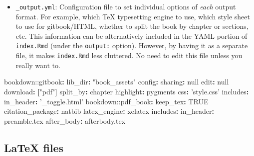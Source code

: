 \documentclass[
]{book}
\newenvironment{Shaded}{\begin{snugshade}}{\end{snugshade}}
\newcommand{\AttributeTok}[1]{\textcolor[rgb]{0.77,0.63,0.00}{#1}}
\newcommand{\CharTok}[1]{\textcolor[rgb]{0.31,0.60,0.02}{#1}}
\newcommand{\FunctionTok}[1]{\textcolor[rgb]{0.00,0.00,0.00}{#1}}
\newcommand{\KeywordTok}[1]{\textcolor[rgb]{0.13,0.29,0.53}{\textbf{#1}}}
\newcommand{\StringTok}[1]{\textcolor[rgb]{0.31,0.60,0.02}{#1}}
\providecommand{\tightlist}{%
  \setlength{\itemsep}{0pt}\setlength{\parskip}{0pt}}
\theoremstyle{definition}
\theoremstyle{definition}
\theoremstyle{definition}
\theoremstyle{remark}
\begin{document}
\begin{itemize}
\tightlist
\item
  \texttt{\_output.yml}: Configuration file to set individual options of \emph{each} output format. For example, which TeX typesetting engine to use, which style sheet to use for gitbook/HTML, whether to split the book by chapter or sections, etc. This information can be alternatively included in the YAML portion of \texttt{index.Rmd} (under the \texttt{output:} option). However, by having it as a separate file, it makes \texttt{index.Rmd} less cluttered. No need to edit this file unless you really want to.
\end{itemize}

\begin{Shaded}
\begin{Highlighting}[]
\AttributeTok{bookdown:}\FunctionTok{:gitbook}\KeywordTok{:}
\AttributeTok{  }\FunctionTok{lib_dir}\KeywordTok{:}\AttributeTok{ }\StringTok{"book_assets"}
\AttributeTok{  }\FunctionTok{config}\KeywordTok{:}
\AttributeTok{    }\FunctionTok{sharing}\KeywordTok{:}\AttributeTok{ }\CharTok{null}
\AttributeTok{    }\FunctionTok{edit}\KeywordTok{:}\AttributeTok{ }\CharTok{null}
\AttributeTok{    }\FunctionTok{download}\KeywordTok{:}\AttributeTok{ }\KeywordTok{[}\StringTok{"pdf"}\KeywordTok{]}
\AttributeTok{  }\FunctionTok{split_by}\KeywordTok{:}\AttributeTok{ chapter}
\AttributeTok{  }\FunctionTok{highlight}\KeywordTok{:}\AttributeTok{ pygments}
\AttributeTok{  }\FunctionTok{css}\KeywordTok{:}\AttributeTok{ }\StringTok{'style.css'}
\AttributeTok{  }\FunctionTok{includes}\KeywordTok{:}
\AttributeTok{    }\FunctionTok{in_header}\KeywordTok{:}\AttributeTok{ }\StringTok{'_toggle.html'}
\AttributeTok{    }
\AttributeTok{bookdown:}\FunctionTok{:pdf_book}\KeywordTok{:}
\AttributeTok{  }\FunctionTok{keep_tex}\KeywordTok{:}\AttributeTok{ }\CharTok{TRUE}
\AttributeTok{  }\FunctionTok{citation_package}\KeywordTok{:}\AttributeTok{ natbib}
\AttributeTok{  }\FunctionTok{latex_engine}\KeywordTok{:}\AttributeTok{ xelatex}
\AttributeTok{  }\FunctionTok{includes}\KeywordTok{:}
\AttributeTok{    }\FunctionTok{in_header}\KeywordTok{:}\AttributeTok{ preamble.tex}
\AttributeTok{    }\FunctionTok{after_body}\KeywordTok{:}\AttributeTok{ afterbody.tex}
\end{Highlighting}
\end{Shaded}

\hypertarget{latex-files}{%
\subsection*{LaTeX files}\label{latex-files}}
\end{document}
